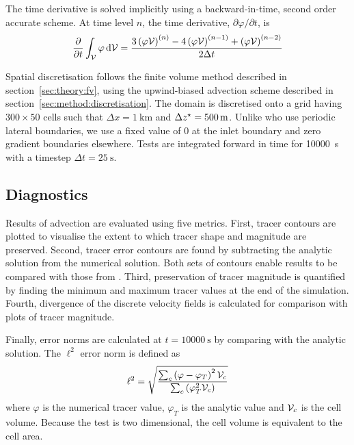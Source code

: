 The time derivative is solved implicitly using a backward-in-time, second order accurate scheme.  At time level $n$, the time derivative, $\partial \varphi / \partial t$, is \autocite{openfoam-progguide}
\begin{align}
	\frac{\partial}{\partial t} \int_{\mathcal{V}} \varphi \mathop{}\!\mathrm{d} \mathcal{V} = \frac{
		3 \left( \varphi \mathcal{V} \right)^{(n)} - 
		4 \left( \varphi \mathcal{V} \right)^{(n-1)} + 
		\left( \varphi \mathcal{V} \right)^{(n-2)}
	}{2 \Delta t}
\end{align}

Spatial discretisation follows the finite volume method described in section~\ref{sec:theory:fv}, using the upwind-biased advection scheme described in section~\ref{sec:method:discretisation}.
The domain is discretised onto a grid having $300 \times 50$ cells such that $\Delta x = \SI{1}{\kilo\meter}$ and $\Delta {z^\star} = \SI{500}{\meter}$.  Unlike \textcite{schaer2002} who use periodic lateral boundaries, we use a fixed value of 0 at the inlet boundary and zero gradient boundaries elsewhere.
Tests are integrated forward in time for \SI{10000}{\second} with a timestep $\Delta t = \SI{25}{\second}$.

\subsection{Diagnostics}
Results of advection are evaluated using five metrics.  First, tracer contours are plotted to visualise the extent to which tracer shape and magnitude are preserved.  Second, tracer error contours are found by subtracting the analytic solution from the numerical solution.  Both sets of contours enable results to be compared with those from \textcite{schaer2002}.  Third, preservation of tracer magnitude is quantified by finding the minimum and maximum tracer values at the end of the simulation.  Fourth, divergence of the discrete velocity fields is calculated for comparison with plots of tracer magnitude.

Finally, error norms are calculated at $t = \SI{10000}{\second}$ by comparing with the analytic solution.  The $\ell^2$ error norm is defined as
\begin{align}
	\ell^2 = \sqrt{\frac{\sum_c \left( \varphi - \varphi_{T} \right)^2 \mathcal{V}_c}{\sum_c \left( \varphi_T^2 \mathcal{V}_c \right)}}
\end{align}
where $\varphi$ is the numerical tracer value, $\varphi_T$ is the analytic value and $\mathcal{V}_c$ is the cell volume.  Because the test is two dimensional, the cell volume is equivalent to the cell area.  

